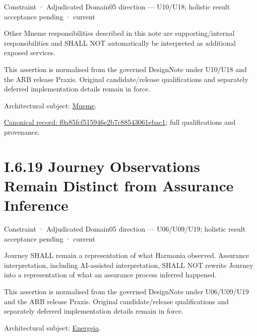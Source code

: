 \label{element:f0a85fcf515946e2b7c88543061ebac1}
{\small Constraint · Adjudicated Domain05 direction — U10/U18; holistic result acceptance pending · current}\par

Other Mneme responsibilities described in this note are supporting/internal responsibilities and SHALL NOT automatically be interpreted as additional exposed services.



This assertion is normalised from the governed DesignNote under U10/U18 and the ARB release Praxis. Original candidate/release qualifications and separately deferred implementation details remain in force.



Architectural subject: \hyperref[element:1af8a56358f7429fabfb57be66542a99]{Mneme}.


{\footnotesize \href{../../../../continuum/motivation/constraint/f0a85fcf515946e2b7c88543061ebac1.md}{Canonical record: f0a85fcf515946e2b7c88543061ebac1}; full qualifications and provenance.}\par
\section*{I.6.19 Journey Observations Remain Distinct from Assurance Inference}
\label{navigation:I.6.19}

\label{element:ae2fa71039034290b019eb1cc6eb1996}
{\small Constraint · Adjudicated Domain05 direction — U06/U09/U19; holistic result acceptance pending · current}\par

Journey SHALL remain a representation of what Harmonia observed. Assurance interpretation, including AI-assisted interpretation, SHALL NOT rewrite Journey into a representation of what an assurance process inferred happened.



This assertion is normalised from the governed DesignNote under U06/U09/U19 and the ARB release Praxis. Original candidate/release qualifications and separately deferred implementation details remain in force.



Architectural subject: \hyperref[element:fb3f37a6ac614415ac486a6de9d35994]{Energeia}.


